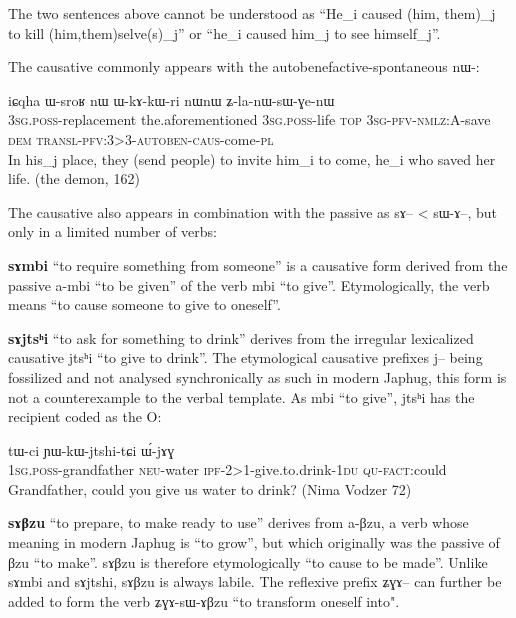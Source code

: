 \documentclass[oldfontcommands,oneside,a4paper,11pt]{article}
\newcommand{\ipa}[1]{{\phon \mbox{#1}}} %
\newcommand{\sg}{\textsc{sg}}
\newcommand{\pl}{\textsc{pl}}
\newcommand{\pfv}{\textsc{pfv}}
\newcommand{\auto}{\textsc{autoben}}
\newcommand{\caus}{\textsc{caus}}
\newcommand{\dem}{\textsc{dem}}
\newcommand{\du}{\textsc{du}}
\newcommand{\ipf}{\textsc{ipf}}
\newcommand{\neu}{\textsc{neu}}
\newcommand{\nmlz}{\textsc{nmlz}}
\newcommand{\fact}{\textsc{fact}}
\newcommand{\poss}{\textsc{poss}}
\newcommand{\qu}{\textsc{qu}}
\newcommand{\topic}{\textsc{top}}
\newcommand{\transloc}{\textsc{transl}}
\begin{document}
The two sentences above cannot be understood as  ``He_i caused (him, them)_j to kill (him,them)selve(s)_j'' or ``he_i caused him_j to see himself_j''.


The causative commonly appears with the autobenefactive-spontaneous \ipa{nɯ-}:


 \begin{exe}
\ex 
\gll \ipa{ɯ-sci} 	\ipa{iɕqha} 	\ipa{ɯ-sroʁ} 	\ipa{nɯ} 	\ipa{ɯ-kɤ-kɯ-ri} 	\ipa{nɯnɯ} \ipa{ʑ-la-nɯ-sɯ-ɣe-nɯ} \\
3\sg{}.\poss{}-replacement the.aforementioned 3\sg{}.\poss{}-life \topic{} 3\sg{}-\pfv{}-\nmlz{}:A-save \dem{} \transloc{}-\pfv{}:3>3-\auto{}-\caus{}-come-\pl{} \\
\glt In his_j place, they (send people) to invite him_i to come, he_i who saved her life.    (the demon, 162)
\end{exe}

 The causative also appears in combination with the passive as \ipa{sɤ}-- < \ipa{sɯ-ɤ}--, but only in a limited number of verbs:
 
 
  \textbf{\ipa{sɤmbi}} ``to require something from someone'' is a causative form derived from the passive \ipa{a-mbi} ``to be given'' of the verb \ipa{mbi} ``to give''. Etymologically, the verb means ``to cause someone to give to oneself''. 
  
  
  
    \textbf{\ipa{sɤjtsʰi}} ``to ask for something to drink'' derives from the irregular lexicalized causative \ipa{jtsʰi} ``to give to drink''. The etymological causative prefixes \ipa{j}-- being fossilized and not analysed synchronically as such in modern Japhug, this form is not a counterexample to the verbal template. As \ipa{mbi} ``to give'', \ipa{jtsʰi} has the recipient coded as the O:
      \begin{exe}
\ex
\gll   \ipa{a-wɯ} 	\ipa{tɯ-ci} 	\ipa{ɲɯ-kɯ-jtshi-tɕi} 	\ipa{ɯ́-jɤɣ}  \\
1\sg{}.\poss{}-grandfather \neu{}-water \ipf{}-2>1-give.to.drink-1\du{} \qu{}-\fact{}:could \\
 \glt Grandfather, could you give us water to drink? (Nima Vodzer 72)
\end{exe}   
 
  
  \textbf{\ipa{sɤβzu}} ``to prepare, to make ready to use'' derives from \ipa{a-βzu}, a verb whose meaning in modern Japhug is ``to grow'', but which originally was the passive of \ipa{βzu} ``to make''. \ipa{sɤβzu}  is therefore etymologically ``to cause to be made''. Unlike   \ipa{sɤmbi} and \ipa{sɤjtshi}, \ipa{sɤβzu} is always labile. The reflexive prefix \ipa{ʑɣɤ}-- can further be added to form the verb \ipa{ʑɣɤ-sɯ-ɤβzu} ``to transform oneself into".
\end{document}
